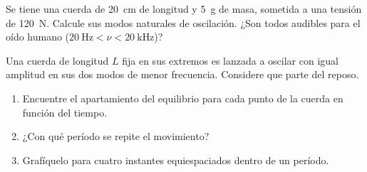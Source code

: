 \item Se tiene una cuerda de \SI{20}{\centi\metre} de longitud y \SI{5}{\gram} de masa, sometida a una tensión de \SI{120}{\newton}.
Calcule sus modos naturales de oscilación.
¿Son todos audibles para el oído humano (\(\SI{20}{\hertz} < \nu < \SI{20}{\kilo\hertz}\))?



\item Una cuerda de longitud $L$ fija en sus extremos es lanzada a oscilar con igual amplitud en sus dos modos de menor frecuencia.
Considere que parte del reposo. 
\begin{enumerate}
	\item Encuentre el apartamiento del equilibrio para cada punto de la cuerda en función del tiempo.
	\item ¿Con qué período se repite el movimiento?
	\item Grafíquelo para cuatro instantes equiespaciados dentro de un período. 
\end{enumerate}


